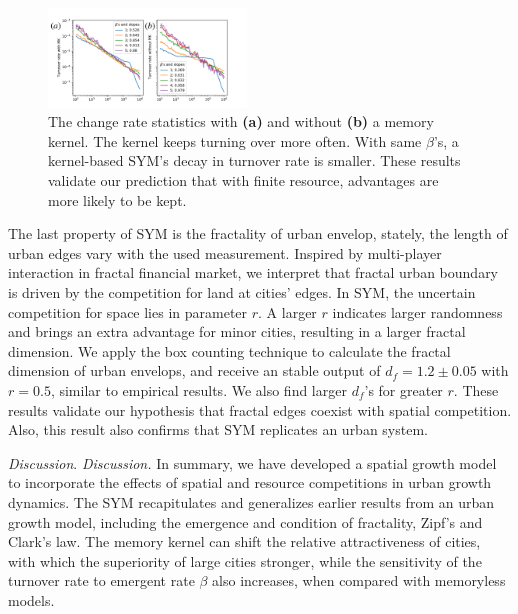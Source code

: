 \documentclass[reprint,unsortedaddress,amsmath,amssymb,aps,prl,showkeys]{revtex4-2}
\begin{document}
\begin{figure}
	\centering
	\includegraphics[width = 0.47\textwidth]{pics/in_one_now_now.pdf}
	\caption{The change rate statistics with \textbf{(a)} and without \textbf{(b)} a memory kernel. The kernel keeps turning over more often. With same $\beta$'s, a kernel-based SYM's decay in turnover rate is smaller. These results validate our prediction that with finite resource, advantages are more likely to be kept.}
	\label{changerate}
\end{figure}

The last property of SYM is the fractality of urban envelop, stately, the length of urban edges vary with the used measurement. Inspired by multi-player interaction in fractal financial market\cite{PhysRevE.65.037106}, we interpret that fractal urban boundary is driven by the competition for land at cities' edges. In SYM, the uncertain competition for space lies in parameter $r$. A larger $r$ indicates larger randomness and brings an extra advantage for minor cities, resulting in a larger fractal dimension. We apply the box counting technique to calculate the fractal dimension of urban envelops, and receive an stable output of $d_f = 1.2\pm 0.05$ with $r = 0.5$, similar to empirical results\cite{batty1992form}. We also find larger $d_f$'s for greater $r$. These results validate our hypothesis that fractal edges coexist with spatial competition. Also, this result also confirms that SYM replicates an urban system.

\textit{Discussion}. 
\textit{Discussion.} In summary, we have developed a spatial growth model to incorporate the effects of spatial and resource competitions in urban growth dynamics. The SYM recapitulates and generalizes earlier results from an urban growth model, including the emergence and condition of fractality, Zipf's and Clark's law. The memory kernel can shift the relative attractiveness of cities, with which the superiority of large cities stronger, while the sensitivity of the turnover rate to emergent rate $\beta$ also increases, when compared with memoryless models.
\end{document}
